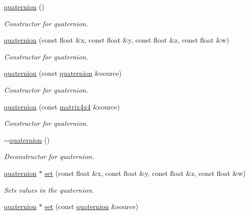 \begin{DoxyCompactItemize}
\item 
\hyperlink{classflounder_1_1quaternion_ae3b0e48772c0394a9a87aedc9b89e5b6}{quaternion} ()
\begin{DoxyCompactList}\small\item\em Constructor for quaternion. \end{DoxyCompactList}\item 
\hyperlink{classflounder_1_1quaternion_a007f42c75fcb2eb05c62490bf44e5e94}{quaternion} (const float \&x, const float \&y, const float \&z, const float \&w)
\begin{DoxyCompactList}\small\item\em Constructor for quaternion. \end{DoxyCompactList}\item 
\hyperlink{classflounder_1_1quaternion_ab5cdf1b9c7e7716de3f8f3a120917416}{quaternion} (const \hyperlink{classflounder_1_1quaternion}{quaternion} \&source)
\begin{DoxyCompactList}\small\item\em Constructor for quaternion. \end{DoxyCompactList}\item 
\hyperlink{classflounder_1_1quaternion_a33068d946a6728158f00da62d7288639}{quaternion} (const \hyperlink{classflounder_1_1matrix4x4}{matrix4x4} \&source)
\begin{DoxyCompactList}\small\item\em Constructor for quaternion. \end{DoxyCompactList}\item 
\hyperlink{classflounder_1_1quaternion_a08ebd87c25488f0a7aff8521e2d56eb9}{$\sim$quaternion} ()
\begin{DoxyCompactList}\small\item\em Deconstructor for quaternion. \end{DoxyCompactList}\item 
\hyperlink{classflounder_1_1quaternion}{quaternion} $\ast$ \hyperlink{classflounder_1_1quaternion_ae235a9f152b8dff54aafd36cd28be8e1}{set} (const float \&x, const float \&y, const float \&z, const float \&w)
\begin{DoxyCompactList}\small\item\em Sets values in the quaternion. \end{DoxyCompactList}\item 
\hyperlink{classflounder_1_1quaternion}{quaternion} $\ast$ \hyperlink{classflounder_1_1quaternion_aabccfb51585cd98a0d3a78bb7286f932}{set} (const \hyperlink{classflounder_1_1quaternion}{quaternion} \&source)

\end{DoxyCompactItemize}
